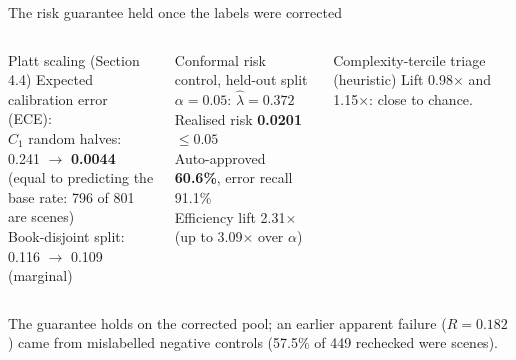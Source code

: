 \documentclass[aspectratio=169,10pt]{beamer}
\newcommand{\takeaway}[1]{\vfill\begin{keybox}#1\end{keybox}}
\begin{document}
\begin{frame}{The risk guarantee held once the labels were corrected}
\begin{columns}[T,onlytextwidth]
\begin{defbox}{Platt scaling (Section 4.4)}
Expected calibration error (ECE):\\
$C_1$ random halves: 0.241 $\to$ \textbf{0.0044}\\
{\scriptsize (equal to predicting the base rate: 796 of 801 are scenes)}\\[2pt]
Book-disjoint split: 0.116 $\to$ 0.109 (marginal)
\end{defbox}
\begin{defbox}{Conformal risk control, held-out split}
$\alpha = 0.05$: $\hat\lambda = 0.372$\\
Realised risk \textbf{0.0201} $\leq 0.05$\\
Auto-approved \textbf{60.6\%}, error recall 91.1\%\\
Efficiency lift 2.31$\times$ (up to 3.09$\times$ over $\alpha$)
\end{defbox}\vspace{3pt}
\begin{defbox}{Complexity-tercile triage (heuristic)}
Lift 0.98$\times$ and 1.15$\times$: close to chance.
\end{defbox}
\end{columns}
\takeaway{The guarantee holds on the corrected pool; an earlier apparent failure ($R = 0.182$) came from mislabelled negative controls (57.5\% of 449 rechecked were scenes).}
\end{frame}
\end{document}
